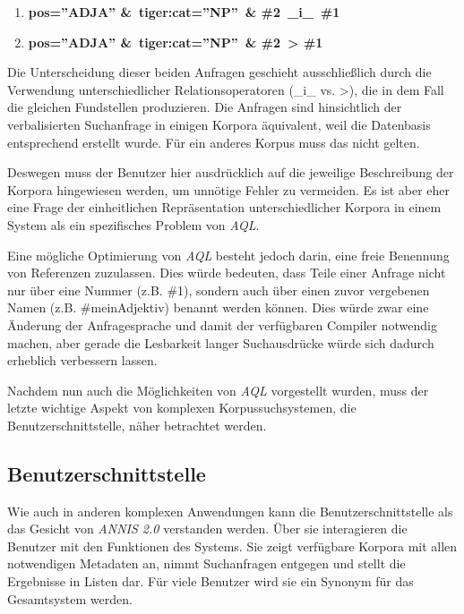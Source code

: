 \begin{enumerate}
	\item{\textbf{pos=''ADJA'' \&\ tiger:cat=''NP''\ \& \#2\ \_i\_\ \#1}}
	\item{\textbf{pos=''ADJA'' \&\ tiger:cat=''NP''\ \& \#2\ > \#1}}
\end{enumerate}

Die Unterscheidung dieser beiden Anfragen geschieht ausschließlich durch die Verwendung unterschiedlicher Relationsoperatoren (\_i\_ vs. >), die in dem Fall die gleichen Fundstellen produzieren. Die Anfragen sind hinsichtlich der verbalisierten Suchanfrage in einigen Korpora äquivalent, weil die Datenbasis entsprechend erstellt wurde. Für ein anderes Korpus muss das nicht gelten.

Deswegen muss der Benutzer hier ausdrücklich auf die jeweilige Beschreibung der Korpora hingewiesen werden, um unnötige Fehler zu vermeiden. Es ist aber eher eine Frage der einheitlichen Repräsentation unterschiedlicher Korpora in einem System als ein spezifisches Problem von \emph{AQL}.

Eine mögliche Optimierung von \emph{AQL} besteht jedoch darin, eine freie Benennung von Referenzen zuzulassen. Dies würde bedeuten, dass Teile einer Anfrage nicht nur über eine Nummer (z.B. \#1), sondern auch über einen zuvor vergebenen Namen (z.B. \#meinAdjektiv) benannt werden können. Dies würde zwar eine Änderung der Anfragesprache und damit der verfügbaren Compiler notwendig machen, aber gerade die Lesbarkeit langer Suchausdrücke würde sich dadurch erheblich verbessern lassen.

Nachdem nun auch die Möglichkeiten von \emph{AQL} vorgestellt wurden, muss der letzte wichtige Aspekt von komplexen Korpussuchsystemen, die Benutzerschnittstelle, näher betrachtet werden.

\subsection{Benutzerschnittstelle}\label{sec:Korpussuche.Benutzerschnittstelle}

Wie auch in anderen komplexen Anwendungen kann die Benutzerschnittstelle als das Gesicht von \emph{ANNIS 2.0} verstanden werden. Über sie interagieren die Benutzer mit den Funktionen des Systems. Sie zeigt verfügbare Korpora mit allen notwendigen Metadaten an, nimmt Suchanfragen entgegen und stellt die Ergebnisse in Listen dar. Für viele Benutzer wird sie ein Synonym für das Gesamtsystem werden.

